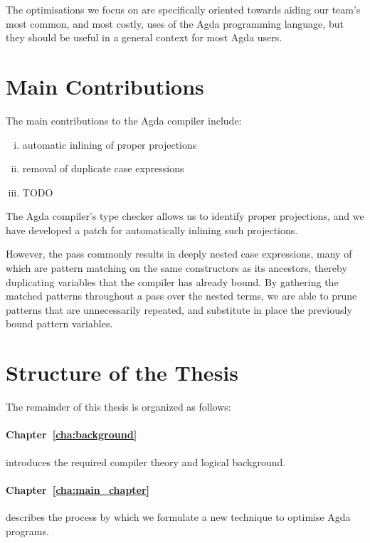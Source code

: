 The optimisations we focus on are specifically oriented towards aiding our team's most common, and most costly, uses of the Agda programming language, but they should be useful in a general context for most Agda users.

\section{Main Contributions}
\label{sec:main_contributions}

The main contributions to the Agda compiler include:
\begin{enumerate}[(i)]
	\item automatic inlining of proper projections
	\item removal of duplicate case expressions
	\item TODO
\end{enumerate}

The Agda compiler's type checker allows us to identify proper projections, and we have developed a patch for automatically inlining such projections.

However, the pass commonly results in deeply nested case expressions, many of which are pattern matching on the same constructors as its ancestors, thereby duplicating variables that the compiler has already bound. By gathering the matched patterns throughout a pass over the nested terms, we are able to prune patterns that are unnecessarily repeated, and substitute in place the previously bound pattern variables.

\section{Structure of the Thesis}
\label{sec:structure_of_the_thesis}

The remainder of this thesis is organized as follows:

\paragraph{Chapter~\ref{cha:background}} introduces the required compiler theory and logical background.


\paragraph{Chapter~\ref{cha:main_chapter}} describes the process by which we formulate a new technique to optimise Agda programs.

